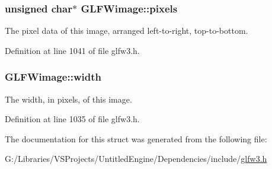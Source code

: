 \hypertarget{struct_g_l_f_wimage_a0c532a5c2bb715555279b7817daba0fb}{}
\subsubsection[{pixels}]{\setlength{\rightskip}{0pt plus 5cm}unsigned char$\ast$ G\+L\+F\+Wimage\+::pixels}\label{struct_g_l_f_wimage_a0c532a5c2bb715555279b7817daba0fb}
The pixel data of this image, arranged left-\/to-\/right, top-\/to-\/bottom. 

Definition at line 1041 of file glfw3.\+h.

\hypertarget{struct_g_l_f_wimage_af6a71cc999fe6d3aea31dd7e9687d835}{}
\subsubsection[{width}]{ G\+L\+F\+Wimage\+::width}\label{struct_g_l_f_wimage_af6a71cc999fe6d3aea31dd7e9687d835}
The width, in pixels, of this image. 

Definition at line 1035 of file glfw3.\+h.



The documentation for this struct was generated from the following file\+:\begin{DoxyCompactItemize}
\item 
G\+:/\+Libraries/\+V\+S\+Projects/\+Untitled\+Engine/\+Dependencies/include/\hyperlink{glfw3_8h}{glfw3.\+h}\end{DoxyCompactItemize}
